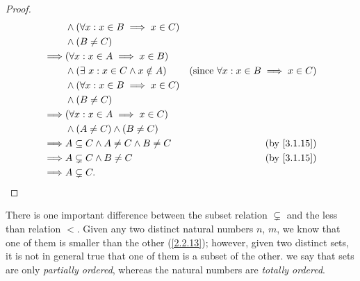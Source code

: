 \begin{proof}
\begin{align*}
             & \land (\forall x : x \in B \implies x \in C)                                                                                              \\
             & \land (B \neq C)                                                                                                                          \\
    \implies & (\forall x : x \in A \implies x \in B)                                                                                                    \\
             & \land (\exists\ x : x \in C \land x \notin A)                                   & \text{(since \(\forall x : x \in B \implies x \in C\))} \\
             & \land (\forall x : x \in B \implies x \in C)                                                                                              \\
             & \land (B \neq C)                                                                                                                          \\
    \implies & (\forall x : x \in A \implies x \in C)                                                                                                    \\
             & \land (A \neq C) \land (B \neq C)                                                                                                         \\
    \implies & A \subseteq C \land A \neq C \land B \neq C                                     & \text{(by \cref{3.1.15})}                               \\
    \implies & A \subsetneq C \land B \neq C                                                   & \text{(by \cref{3.1.15})}                               \\
    \implies & A \subsetneq C.
  \end{align*}
\end{proof}

\setcounter{theorem}{19}
\begin{remark}\label{3.1.20}
  There is one important difference between the subset relation \(\subsetneq\) and the less than relation \(<\).
  Given any two distinct natural numbers \(n\), \(m\), we know that one of them is smaller than the other (\cref{2.2.13});
  however, given two distinct sets, it is not in general true that one of them is a subset of the other.
  we say that sets are only \emph{partially ordered}, whereas the natural numbers are \emph{totally ordered}.
\end{remark}


